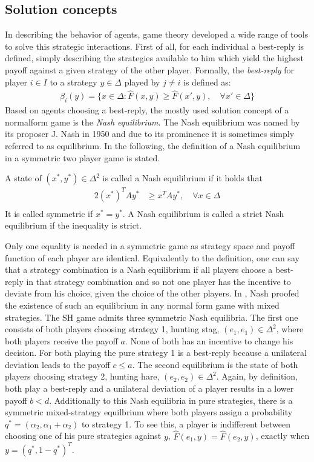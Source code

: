\documentclass[11pt]{article}
\begin{document}
\subsection{Solution concepts}
\label{sec:traditionalconcepts}
In describing the behavior of agents, game theory developed a wide range of 
tools to solve this strategic interactions. First of all, for each individual
a best-reply is defined, simply describing the strategies available to him 
which yield the highest payoff against a given strategy of the other player.
Formally, the \textit{best-reply} for player $i \in I$ to a 
strategy $y \in \Delta$ played by $j \neq i$ is defined as:
\begin{align}
        \beta_i(y) = \{x \in \Delta: \hat{F}(x,y) \geq \hat{F}(x',y), 
        \quad \forall x' \in \Delta\}
\end{align}
Based on agents choosing a best-reply, the mostly used solution concept of
a normalform game is the \textit{Nash equilibrium}.
The Nash equilibrium was named by its proposer J. Nash in 1950 
and due to its prominence it is sometimes simply referred to as equilibrium.
In the following, the definition of a Nash equilibrium in a symmetric two
player game is stated. 
\begin{mydef}
        \label{def:nashequilibrium}
        A state of $(x^*,y^*) \in \Delta^2$ is called a Nash equilibrium if 
        it holds that
        \begin{alignat*}{2}
                (x^*)^T A y^* &\geq x^T A y^*, \quad \forall x \in \Delta \\
        \end{alignat*}
It is called symmetric if $x^* = y^*$. A Nash equilibrium is called a 
strict Nash equilibrium if the inequality is strict.
\end{mydef}
Only one equality is needed in a symmetric game as strategy space and
payoff function of each player are identical.
Equivalently to the definition, one can say that a strategy combination 
is a Nash equilibrium if all players choose a best-reply in that strategy 
combination and so not one player has the incentive to deviate from his 
choice, given the choice of the other players.
In \textcite{nash_equilibrium_1950}, Nash proofed the existence of such 
an equilibrium in any normal form game with mixed strategies. 
The SH game admits three symmetric Nash equilibria. The first one consists
of both players choosing strategy 1, hunting stag, $(e_1,e_1) \in
\Delta^2$, where both players receive the payoff $a$. 
None of both has an incentive to change his decision. For both
playing the pure strategy 1 is a best-reply because a unilateral deviation 
leads to the payoff $c \leq a$.
The second equilibrium is the state of 
both players choosing strategy 2, hunting hare, $(e_2,e_2)
\in \Delta^2$. Again, by definition, both play a best-reply and a unilateral 
deviation of a player results in a lower payoff $b<d$.
Additionally to this Nash equilibria in pure strategies, there is a symmetric
mixed-strategy equilbrium where both players assign a probability 
$q^*=(\alpha_2,\alpha_1 + \alpha_2)$ to strategy 1. 
To see this, a player is indifferent between choosing one of his pure
strategies against $y$, $\hat{F}(e_1,y) = \hat{F}(e_2,y)$, exactly
when $y=(q^*,1-q^*)^T$.
\end{document}
